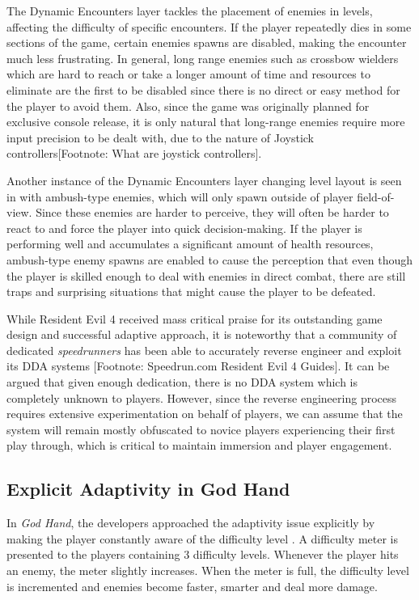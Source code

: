 \documentclass[cic,tc,english]{iiufrgs}
\begin{document}
The Dynamic Encounters layer tackles the placement of enemies in levels, affecting the difficulty of specific encounters. If the player repeatedly dies in some sections of the game, certain enemies spawns are disabled, making the encounter much less frustrating. In general, long range enemies such as crossbow wielders which are hard to reach or take a longer amount of time and resources to eliminate are the first to be disabled since there is no direct or easy method for the player to avoid them. Also, since the game was originally planned for exclusive console release, it is only natural that long-range enemies require more input precision to be dealt with, due to the nature of Joystick controllers[Footnote: What are joystick controllers].

Another instance of the Dynamic Encounters layer changing level layout is seen in with ambush-type enemies, which will only spawn outside of player field-of-view. Since these enemies are harder to perceive, they will often be harder to react to and force the player into quick decision-making. If the player is performing well and accumulates a significant amount of health resources, ambush-type enemy spawns are enabled to cause the perception that even though the player is skilled enough to deal with enemies in direct combat, there are still traps and surprising situations that might cause the player to be defeated.

While Resident Evil 4 received mass critical praise for its outstanding game design and successful adaptive approach, it is noteworthy that a community of dedicated \emph{speedrunners} has been able to accurately reverse engineer and exploit its DDA systems [Footnote: Speedrun.com Resident Evil 4 Guides]. It can be argued that given enough dedication, there is no DDA system which is completely unknown to players. However, since the reverse engineering process requires extensive experimentation on behalf of players, we can assume that the system will remain mostly obfuscated to novice players experiencing their first play through, which is critical to maintain immersion and player engagement.

\subsection{Explicit Adaptivity in God Hand}

In \emph{God Hand}, the developers approached the adaptivity issue explicitly by making the player constantly aware of the difficulty level \cite{article_subjectivedifficulty}. A difficulty meter is presented to the players containing 3 difficulty levels. Whenever the player hits an enemy, the meter slightly increases. When the meter is full, the difficulty level is incremented and enemies become faster, smarter and deal more damage.
\end{document}
